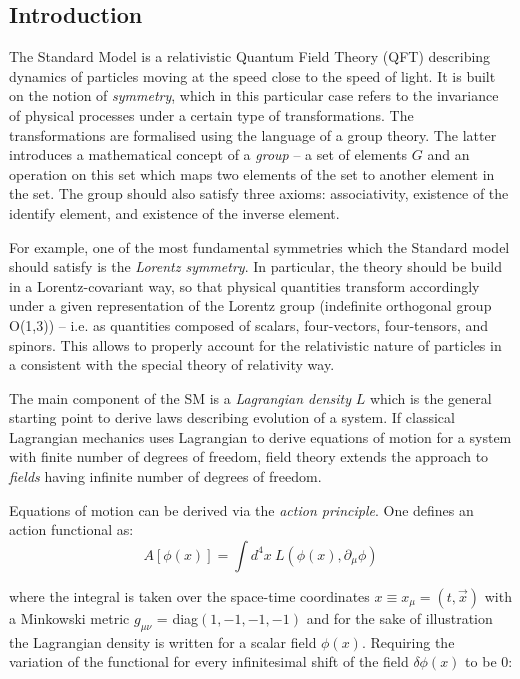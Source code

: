 \subsection{Introduction}\label{sec:lagr-intro}
The Standard Model is a relativistic Quantum Field Theory (QFT) describing dynamics of particles moving at the speed close to the speed of light. It is built on the notion of \textit{symmetry}, which in this particular case refers to the invariance of physical processes under a certain type of transformations. The transformations are formalised using the language of a group theory. The latter introduces a mathematical concept of a \textit{group} -- a set of elements $G$ and an operation on this set which maps two elements of the set to another element in the set. The group should also satisfy three axioms: associativity, existence of the identify element, and existence of the inverse element.

For example, one of the most fundamental symmetries which the Standard model should satisfy is the \textit{Lorentz symmetry}. In particular, the theory should be build in a Lorentz-covariant way, so that physical quantities transform accordingly under a given representation of the Lorentz group (indefinite orthogonal group O(1,3)) -- i.e. as quantities composed of scalars, four-vectors, four-tensors, and spinors. This allows to properly account for the relativistic nature of particles in a consistent with the special theory of relativity way. 

The main component of the SM is a \textit{Lagrangian density} $L$ which is the general starting point to derive laws describing evolution of a system. If classical Lagrangian mechanics uses Lagrangian to derive equations of motion for a system with finite number of degrees of freedom, field theory extends the approach to \textit{fields} having infinite number of degrees of freedom.

Equations of motion can be derived via the \textit{action principle}. One defines an action functional as: 
\begin{equation}
    A[\phi(x)] = \int d^4x ~L(\phi(x), \partial_\mu\phi) 
\end{equation}

where the integral is taken over the space-time coordinates $x \equiv x_\mu = (t, \vec{x})$ with a Minkowski metric $g_{\mu\nu}$ = diag$(1, -1, -1, -1)$ and for the sake of illustration the Lagrangian density is written for a scalar field $\phi(x)$. Requiring the variation of the functional for every infinitesimal 
shift of the field $\delta\phi(x)$ to be 0:


